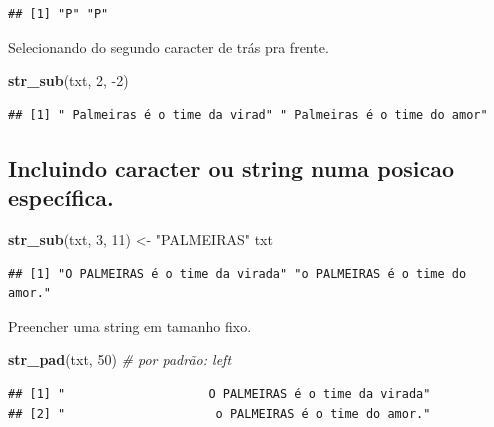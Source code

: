 \documentclass[]{book}
\newenvironment{Shaded}{\begin{snugshade}}{\end{snugshade}}
\newcommand{\CommentTok}[1]{\textcolor[rgb]{0.56,0.35,0.01}{\textit{#1}}}
\newcommand{\DecValTok}[1]{\textcolor[rgb]{0.00,0.00,0.81}{#1}}
\newcommand{\KeywordTok}[1]{\textcolor[rgb]{0.13,0.29,0.53}{\textbf{#1}}}
\newcommand{\NormalTok}[1]{#1}
\newcommand{\StringTok}[1]{\textcolor[rgb]{0.31,0.60,0.02}{#1}}
\begin{document}
\begin{verbatim}
## [1] "P" "P"
\end{verbatim}

Selecionando do segundo caracter de trás pra frente.

\begin{Shaded}
\begin{Highlighting}[]
\KeywordTok{str_sub}\NormalTok{(txt, }\DecValTok{2}\NormalTok{, }\DecValTok{-2}\NormalTok{)}
\end{Highlighting}
\end{Shaded}

\begin{verbatim}
## [1] " Palmeiras é o time da virad" " Palmeiras é o time do amor"
\end{verbatim}

\hypertarget{incluindo-caracter-ou-string-numa-posicao-especuxedfica.}{%
\subsection{Incluindo caracter ou string numa posicao específica.}\label{incluindo-caracter-ou-string-numa-posicao-especuxedfica.}}

\begin{Shaded}
\begin{Highlighting}[]
\KeywordTok{str_sub}\NormalTok{(txt, }\DecValTok{3}\NormalTok{, }\DecValTok{11}\NormalTok{) <-}\StringTok{ "PALMEIRAS"}
\NormalTok{txt}
\end{Highlighting}
\end{Shaded}

\begin{verbatim}
## [1] "O PALMEIRAS é o time da virada" "o PALMEIRAS é o time do amor."
\end{verbatim}

Preencher uma string em tamanho fixo.

\begin{Shaded}
\begin{Highlighting}[]
\KeywordTok{str_pad}\NormalTok{(txt, }\DecValTok{50}\NormalTok{) }\CommentTok{# por padrão: left}
\end{Highlighting}
\end{Shaded}

\begin{verbatim}
## [1] "                    O PALMEIRAS é o time da virada"
## [2] "                     o PALMEIRAS é o time do amor."
\end{verbatim}
\end{document}

